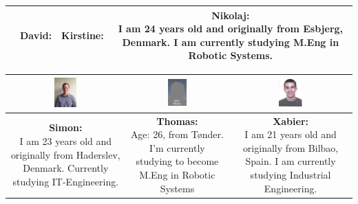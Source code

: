 \begin{table}[h]
\begin{tabular}{|c|c|c|c|}
&

\parbox[t] {0.2\textwidth}{
\textbf{David:} \\

} 

&

\parbox[t] {0.2\textwidth}{
\textbf{Kirstine:} \\

} 

&

\parbox[t] {0.2\textwidth}{
\textbf{Nikolaj:} \\
I am 24 years old and originally from Esbjerg, Denmark. I am currently studying M.Eng in Robotic Systems.
} 

\\\hline
\end{tabular}

\begin{tabular}{|c|c|c|}
\hline
\includegraphics[width=0.2\textwidth]{graphics/Simon_profile} & %
\includegraphics[width=0.2\textwidth]{graphics/AnonProfile} & %
\includegraphics[width=0.2\textwidth]{graphics/sexy_xabi_profile} \\ \hline %
\parbox[t] {0.2\textwidth}{
\textbf{Simon:} \\
I am 23 years old and originally from Haderslev, Denmark. Currently studying IT-Engineering.

} 

&

\parbox[t] {0.2\textwidth}{
\textbf{Thomas:} \\
Age: 26, from Tønder. I'm currently studying to become M.Eng in Robotic Systems
} 

&

\parbox[t] {0.2\textwidth}{
\textbf{Xabier:} \\
I am 21 years old and originally from Bilbao, Spain. I am currently studying Industrial Engineering.
} 

\\\hline
\end{tabular}
\end{table}
